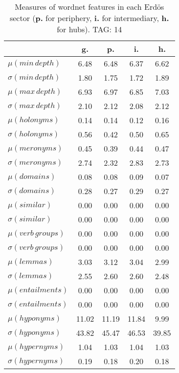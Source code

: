 \begin{table}[h!]
\begin{center}
\begin{tabular}{| l | c | c | c | c |}\hline
 & g. & p. & i. & h. \\\hline
$\mu(min\,depth)$ & 6.48  & 6.48  & 6.37  & 6.62 \\\hline
$\sigma(min\,depth)$ & 1.80  & 1.75  & 1.72  & 1.89 \\\hline
$\mu(max\,depth)$ & 6.93  & 6.97  & 6.85  & 7.03 \\\hline
$\sigma(max\,depth)$ & 2.10  & 2.12  & 2.08  & 2.12 \\\hline
$\mu(holonyms)$ & 0.14  & 0.14  & 0.12  & 0.16 \\\hline
$\sigma(holonyms)$ & 0.56  & 0.42  & 0.50  & 0.65 \\\hline
$\mu(meronyms)$ & 0.45  & 0.39  & 0.44  & 0.47 \\\hline
$\sigma(meronyms)$ & 2.74  & 2.32  & 2.83  & 2.73 \\\hline
$\mu(domains)$ & 0.08  & 0.08  & 0.09  & 0.07 \\\hline
$\sigma(domains)$ & 0.28  & 0.27  & 0.29  & 0.27 \\\hline
$\mu(similar)$ & 0.00  & 0.00  & 0.00  & 0.00 \\\hline
$\sigma(similar)$ & 0.00  & 0.00  & 0.00  & 0.00 \\\hline
$\mu(verb\,groups)$ & 0.00  & 0.00  & 0.00  & 0.00 \\\hline
$\sigma(verb\,groups)$ & 0.00  & 0.00  & 0.00  & 0.00 \\\hline
$\mu(lemmas)$ & 3.03  & 3.12  & 3.04  & 2.99 \\\hline
$\sigma(lemmas)$ & 2.55  & 2.60  & 2.60  & 2.48 \\\hline
$\mu(entailments)$ & 0.00  & 0.00  & 0.00  & 0.00 \\\hline
$\sigma(entailments)$ & 0.00  & 0.00  & 0.00  & 0.00 \\\hline
$\mu(hyponyms)$ & 11.02  & 11.19  & 11.84  & 9.99 \\\hline
$\sigma(hyponyms)$ & 43.82  & 45.47  & 46.53  & 39.85 \\\hline
$\mu(hypernyms)$ & 1.04  & 1.03  & 1.04  & 1.03 \\\hline
$\sigma(hypernyms)$ & 0.19  & 0.18  & 0.20  & 0.18 \\\hline
\end{tabular}
\caption{Measures of wordnet features in each Erd\"os sector ({{\bf p.}} for periphery, {{\bf i.}} for intermediary, {{\bf h.}} for hubs). TAG: 14}
\end{center}
\end{table}